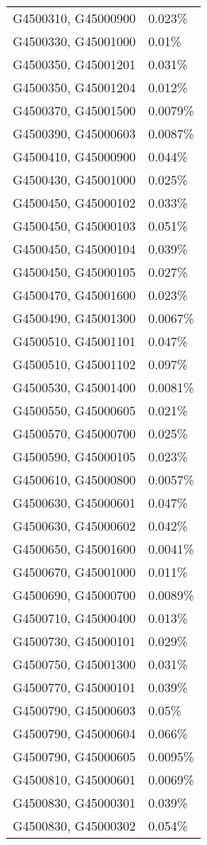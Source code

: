 \begin{longtable}[]{@{}ll@{}}
G4500310, G45000900 & 0.023\% \\
G4500330, G45001000 & 0.01\% \\
G4500350, G45001201 & 0.031\% \\
G4500350, G45001204 & 0.012\% \\
G4500370, G45001500 & 0.0079\% \\
G4500390, G45000603 & 0.0087\% \\
G4500410, G45000900 & 0.044\% \\
G4500430, G45001000 & 0.025\% \\
G4500450, G45000102 & 0.033\% \\
G4500450, G45000103 & 0.051\% \\
G4500450, G45000104 & 0.039\% \\
G4500450, G45000105 & 0.027\% \\
G4500470, G45001600 & 0.023\% \\
G4500490, G45001300 & 0.0067\% \\
G4500510, G45001101 & 0.047\% \\
G4500510, G45001102 & 0.097\% \\
G4500530, G45001400 & 0.0081\% \\
G4500550, G45000605 & 0.021\% \\
G4500570, G45000700 & 0.025\% \\
G4500590, G45000105 & 0.023\% \\
G4500610, G45000800 & 0.0057\% \\
G4500630, G45000601 & 0.047\% \\
G4500630, G45000602 & 0.042\% \\
G4500650, G45001600 & 0.0041\% \\
G4500670, G45001000 & 0.011\% \\
G4500690, G45000700 & 0.0089\% \\
G4500710, G45000400 & 0.013\% \\
G4500730, G45000101 & 0.029\% \\
G4500750, G45001300 & 0.031\% \\
G4500770, G45000101 & 0.039\% \\
G4500790, G45000603 & 0.05\% \\
G4500790, G45000604 & 0.066\% \\
G4500790, G45000605 & 0.0095\% \\
G4500810, G45000601 & 0.0069\% \\
G4500830, G45000301 & 0.039\% \\
G4500830, G45000302 & 0.054\% \\

\end{longtable}
